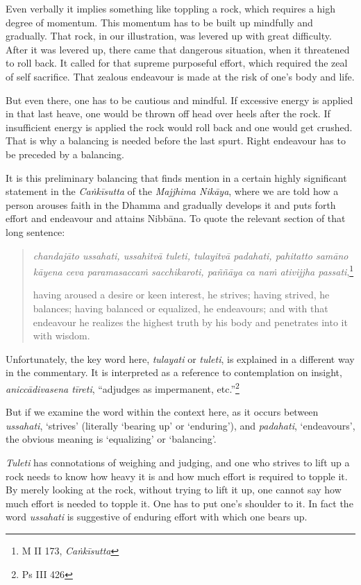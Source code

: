 Even verbally it implies something like toppling a rock, which requires a high degree of momentum. This momentum has to be built up mindfully and gradually. That rock, in our illustration, was levered up with great difficulty. After it was levered up, there came that dangerous situation, when it threatened to roll back. It called for that supreme purposeful effort, which required the zeal of self sacrifice. That zealous endeavour is made at the risk of one's body and life.

But even there, one has to be cautious and mindful. If excessive energy is applied in that last heave, one would be thrown off head over heels after the rock. If insufficient energy is applied the rock would roll back and one would get crushed. That is why a balancing is needed before the last spurt. Right endeavour has to be preceded by a balancing.

It is this preliminary balancing that finds mention in a certain highly significant statement in the \emph{Caṅkīsutta} of the \emph{Majjhima Nikāya}, where we are told how a person arouses faith in the Dhamma and gradually develops it and puts forth effort and endeavour and attains Nibbāna. To quote the relevant section of that long sentence:

\begin{quote}
\emph{chandajāto ussahati, ussahitvā tuleti, tulayitvā padahati, pahitatto samāno kāyena ceva paramasaccaṁ sacchikaroti, paññāya ca naṁ ativijjha passati},\footnote{M II 173, \emph{Caṅkīsutta}}

having aroused a desire or keen interest, he strives; having strived, he balances; having balanced or equalized, he endeavours; and with that endeavour he realizes the highest truth by his body and penetrates into it with wisdom.
\end{quote}

Unfortunately, the key word here, \emph{tulayati} or \emph{tuleti}, is explained in a different way in the commentary. It is interpreted as a reference to contemplation on insight, \emph{aniccādivasena tīreti}, ``adjudges as impermanent, etc.''\footnote{Ps III 426}

But if we examine the word within the context here, as it occurs between \emph{ussahati}, `strives' (literally `bearing up' or `enduring'), and \emph{padahati}, `endeavours', the obvious meaning is `equalizing' or `balancing'.

\emph{Tuleti} has connotations of weighing and judging, and one who strives to lift up a rock needs to know how heavy it is and how much effort is required to topple it. By merely looking at the rock, without trying to lift it up, one cannot say how much effort is needed to topple it. One has to put one's shoulder to it. In fact the word \emph{ussahati} is suggestive of enduring effort with which one bears up.

